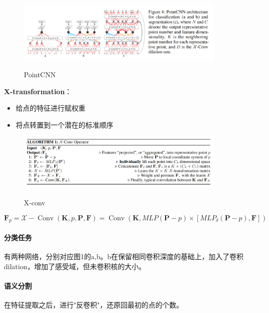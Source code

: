 \documentclass[a4paper,12pt]{article}
\begin{document}
	\begin{figure}[H]
	\begin{center}
		\includegraphics[width=0.9\textwidth]{img/PointCNN.png} 
		\caption{PointCNN}
	\end{center}
\end{figure}

\textbf{X-transformation}：
\begin{itemize}
	\item 给点的特征进行赋权重
	\item 将点转置到一个潜在的标准顺序
\end{itemize}

	\begin{figure}[H]
		\begin{center}
			\includegraphics[width=0.9\textwidth]{img/PointCNN_ALG.png} 
			\caption{X-conv}
		\end{center}
	\end{figure}

$$
\mathbf{F}_{p}=\mathcal{X}-\operatorname{Conv}(\mathbf{K}, p, \mathbf{P}, \mathbf{F})=\operatorname{Conv}\left(\mathbf{K}, M L P(\mathbf{P}-p) \times\left[M L P_{\delta}(\mathbf{P}-p), \mathbf{F}\right]\right)
$$


\paragraph{分类任务}
有两种网络，分别对应图1的a,b。b在保留相同卷积深度的基础上，加入了卷积dilation，增加了感受域，但未卷积核的大小。
\paragraph{语义分割} 在特征提取之后，进行"反卷积"，还原回最初的点的个数。
\end{document}
